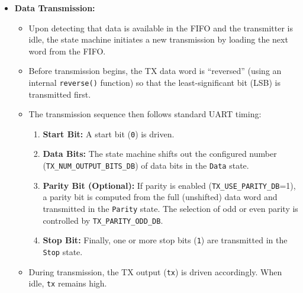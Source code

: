 \begin{itemize}
    \item \textbf{Data Transmission:}
    \begin{itemize}
        \item Upon detecting that data is available in the FIFO and the transmitter is idle, the state machine initiates a new transmission by loading the next word from the FIFO.
        \item Before transmission begins, the TX data word is “reversed” (using an internal \texttt{reverse()} function) so that the least-significant bit (LSB) is transmitted first.
        \item The transmission sequence then follows standard UART timing:
            \begin{enumerate}[noitemsep]
                \item \textbf{Start Bit:} A start bit (\texttt{0}) is driven.
                \item \textbf{Data Bits:} The state machine shifts out the configured number (\texttt{TX\_NUM\_OUTPUT\_BITS\_DB}) of data bits in the \texttt{Data} state.
                \item \textbf{Parity Bit (Optional):} If parity is enabled (\texttt{TX\_USE\_PARITY\_DB}=1), a parity bit is computed from the full (unshifted) data word and transmitted in the \texttt{Parity} state. The selection of odd or even parity is controlled by \texttt{TX\_PARITY\_ODD\_DB}.
                \item \textbf{Stop Bit:} Finally, one or more stop bits (\texttt{1}) are transmitted in the \texttt{Stop} state.
            \end{enumerate}
        \item During transmission, the TX output (\texttt{tx}) is driven accordingly. When idle, \texttt{tx} remains high.
    \end{itemize}
    

\end{itemize}
